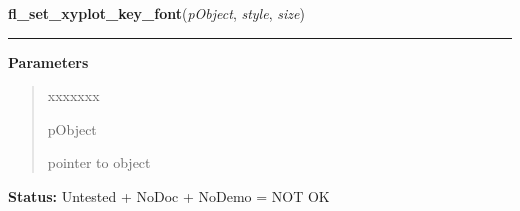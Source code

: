 \hspace{.8\funcindent}\begin{boxedminipage}{\funcwidth}

    \raggedright \textbf{fl\_set\_xyplot\_key\_font}(\textit{pObject}, \textit{style}, \textit{size})

    \vspace{-1.5ex}

    \rule{\textwidth}{0.5\fboxrule}
\setlength{\parskip}{2ex}
\setlength{\parskip}{1ex}
      \textbf{Parameters}
      \vspace{-1ex}

      \begin{quote}
        \begin{Ventry}{xxxxxxx}

          \item[pObject]

          pointer to object

        \end{Ventry}

      \end{quote}

\textbf{Status:} Untested + NoDoc + NoDemo = NOT OK



    \end{boxedminipage}

    \label{xformslib:library:fl_get_xyplot_numdata}

    \vspace{0.5ex}

